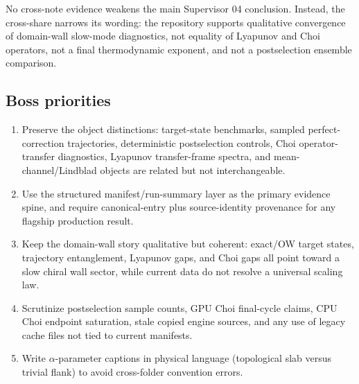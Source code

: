 \documentclass[aps,prb,onecolumn,nofootinbib,superscriptaddress]{revtex4-2}
\begin{document}
No cross-note evidence weakens the main Supervisor 04 conclusion.  Instead, the
cross-share narrows its wording: the repository supports qualitative convergence
of domain-wall slow-mode diagnostics, not equality of Lyapunov and Choi
operators, not a final thermodynamic exponent, and not a postselection ensemble
comparison.

\subsection{Boss priorities}

\begin{enumerate}
\item Preserve the object distinctions: target-state benchmarks, sampled
perfect-correction trajectories, deterministic postselection controls, Choi
operator-transfer diagnostics, Lyapunov transfer-frame spectra, and
mean-channel/Lindblad objects are related but not interchangeable.

\item Use the structured manifest/run-summary layer as the primary evidence
spine, and require canonical-entry plus source-identity provenance for any
flagship production result.

\item Keep the domain-wall story qualitative but coherent: exact/OW target
states, trajectory entanglement, Lyapunov gaps, and Choi gaps all point toward a
slow chiral wall sector, while current data do not resolve a universal scaling
law.

\item Scrutinize postselection sample counts, GPU Choi final-cycle claims,
CPU Choi endpoint saturation, stale copied engine sources, and any use of
legacy cache files not tied to current manifests.

\item Write \(\alpha\)-parameter captions in physical language
(topological slab versus trivial flank) to avoid cross-folder convention errors.
\end{enumerate}
\end{document}
